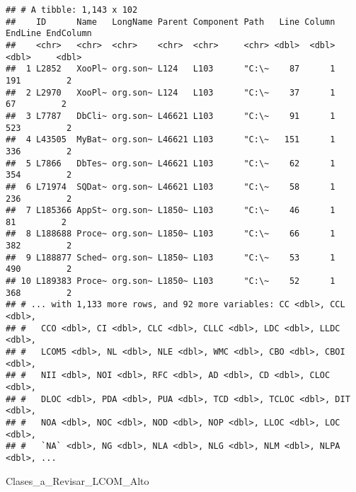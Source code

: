 \documentclass[
]{article}
\newenvironment{Shaded}{\begin{snugshade}}{\end{snugshade}}
\newcommand{\NormalTok}[1]{#1}
\begin{document}
\begin{verbatim}
## # A tibble: 1,143 x 102
##    ID      Name   LongName Parent Component Path   Line Column EndLine EndColumn
##    <chr>   <chr>  <chr>    <chr>  <chr>     <chr> <dbl>  <dbl>   <dbl>     <dbl>
##  1 L2852   XooPl~ org.son~ L124   L103      "C:\~    87      1     191         2
##  2 L2970   XooPl~ org.son~ L124   L103      "C:\~    37      1      67         2
##  3 L7787   DbCli~ org.son~ L46621 L103      "C:\~    91      1     523         2
##  4 L43505  MyBat~ org.son~ L46621 L103      "C:\~   151      1     336         2
##  5 L7866   DbTes~ org.son~ L46621 L103      "C:\~    62      1     354         2
##  6 L71974  SQDat~ org.son~ L46621 L103      "C:\~    58      1     236         2
##  7 L185366 AppSt~ org.son~ L1850~ L103      "C:\~    46      1      81         2
##  8 L188688 Proce~ org.son~ L1850~ L103      "C:\~    66      1     382         2
##  9 L188877 Sched~ org.son~ L1850~ L103      "C:\~    53      1     490         2
## 10 L189383 Proce~ org.son~ L1850~ L103      "C:\~    52      1     368         2
## # ... with 1,133 more rows, and 92 more variables: CC <dbl>, CCL <dbl>,
## #   CCO <dbl>, CI <dbl>, CLC <dbl>, CLLC <dbl>, LDC <dbl>, LLDC <dbl>,
## #   LCOM5 <dbl>, NL <dbl>, NLE <dbl>, WMC <dbl>, CBO <dbl>, CBOI <dbl>,
## #   NII <dbl>, NOI <dbl>, RFC <dbl>, AD <dbl>, CD <dbl>, CLOC <dbl>,
## #   DLOC <dbl>, PDA <dbl>, PUA <dbl>, TCD <dbl>, TCLOC <dbl>, DIT <dbl>,
## #   NOA <dbl>, NOC <dbl>, NOD <dbl>, NOP <dbl>, LLOC <dbl>, LOC <dbl>,
## #   `NA` <dbl>, NG <dbl>, NLA <dbl>, NLG <dbl>, NLM <dbl>, NLPA <dbl>, ...
\end{verbatim}

\begin{Shaded}
\begin{Highlighting}[]
\NormalTok{Clases\_a\_Revisar\_LCOM\_Alto}
\end{Highlighting}
\end{Shaded}
\end{document}
